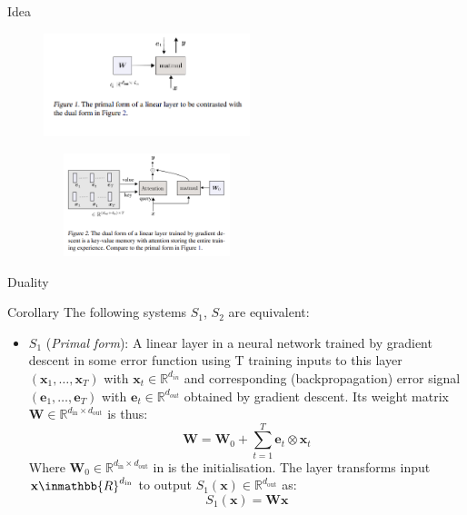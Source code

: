 \documentclass{beamer}
\begin{document}
\begin{frame}{Idea}
    \begin{figure}[t]
        \centering
        \includegraphics[width=6cm, height=3cm]{LNN_primal.png}
    \end{figure}
    \begin{figure}[b]
        \centering
        \includegraphics[width=6cm, height=3cm]{Attn_dual.png}
    \end{figure}
\end{frame}

\begin{frame}{Duality}
    \begin{block}{Corollary}
        The following systems $S_1$, $S_2$ are equivalent:
        \begin{itemize}
            \item $S_1$ (\textit{Primal form}): A linear layer in a neural network trained
        by gradient descent in some error function using T training
        inputs to this layer $(\mathbf{x}_1, \ldots, \mathbf{x}_T)$ with $\mathbf{x}_t \in \mathbb{R}^{d_{in}}$  and corresponding (backpropagation) error signal $(\mathbf{e}_1, \ldots, \mathbf{e}_T)$ with $\mathbf{e}_t \in \mathbb{R}^{d_{out}}$ obtained by gradient descent. Its weight matrix $\mathbf{W}\in\mathbb{R}^{d_{\text{in}}\times d_{\text{out}}}$  is thus:
        \begin{equation}\label{primal_backprop}
            \mathbf{W} = \mathbf{W}_0 + \sum_{t=1}^T \mathbf{e}_t \otimes \mathbf{x}_t
        \end{equation}
        Where $\mathbf{W}_0 \in \mathbb{R}^{d_{\text{in}}\times d_{\text{out}}}$ in is the initialisation. The layer transforms input $\mathbf{x}\inmathbb{R}^{d_{\text{in}}}$ to output $S_1(\mathbf{x})\in\mathbb{R}^{d_{\text{out}}}$ as:
        \begin{equation}\label{primal_form}
            S_1(\mathbf{x}) = \mathbf{W}\mathbf{x}
        \end{equation}
        \end{itemize}
    \end{block}
\end{frame}
\end{document}
